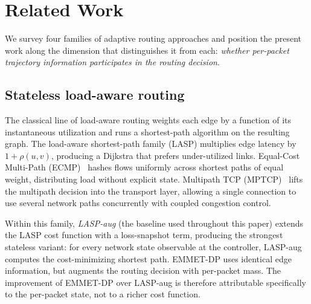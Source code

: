 %

\section{Related Work}
\label{sec:related}

We survey four families of adaptive routing approaches and
position the present work along the dimension that distinguishes
it from each: \emph{whether per-packet trajectory information
participates in the routing decision}.

\subsection{Stateless load-aware routing}
\label{subsec:related-stateless}

The classical line of load-aware routing weights each edge by a
function of its instantaneous utilization and runs a shortest-path
algorithm on the resulting graph. The load-aware shortest-path family (LASP)
multiplies edge latency by $1+\rho(u,v)$, producing a Dijkstra
that prefers under-utilized links. Equal-Cost Multi-Path
(ECMP)~\cite{thaler2000ecmp} hashes flows uniformly across
shortest paths of equal weight, distributing load without explicit
state. Multipath TCP (MPTCP)~\cite{ford2013mptcp} lifts the
multipath decision into the transport layer, allowing a single
connection to use several network paths concurrently with
coupled congestion control.

Within this family, \emph{LASP-aug} (the baseline used throughout
this paper) extends the LASP cost function with a loss-snapshot
term, producing the strongest stateless variant: for every
network state observable at the controller, LASP-aug computes the
cost-minimizing shortest path. EMMET-DP uses identical edge
information, but augments the routing decision with per-packet
mass. The improvement of EMMET-DP over LASP-aug is therefore
attributable specifically to the per-packet state, not to a
richer cost function.

